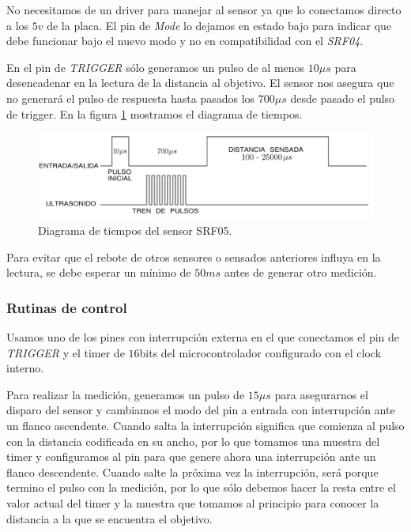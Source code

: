 No necesitamos de un driver para manejar al sensor ya que lo conectamos directo a los $5v$ de la placa.
El pin de \emph{Mode} lo dejamos en estado bajo para indicar que debe funcionar bajo el nuevo modo y no en compatibilidad con el \emph{SRF04}.

En el pin de \emph{TRIGGER} s\'olo generamos un pulso de al menos $10\mu s$ para desencadenar en la lectura de la distancia al objetivo.
El sensor nos asegura que no generar\'a el pulso de respuesta hasta pasados los $700\mu s$ desde pasado el pulso de trigger.
En la figura \ref{hF_srf05_pulse} mostramos el diagrama de tiempos.

\begin{figure}[ht]
	\centering
	\includegraphics[scale=0.25]{figuras/srf05_pulse.png}
	\caption{Diagrama de tiempos del sensor SRF05.}
	\label{hF_srf05_pulse}
\end{figure}

Para evitar que el rebote de otros sensores o sensados anteriores influya en la lectura, se debe esperar un m\'inimo de $50ms$ antes de
generar otro medici\'on.

\subsubsection{Rutinas de control}
\label{h_sensado_ultrasonido_rutinas}

Usamos uno de los pines con interrupci\'on externa en el que conectamos el pin de \emph{TRIGGER} y el timer de $16$bits del microcontrolador
configurado con el clock interno.

Para realizar la medici\'on, generamos un pulso de $15\mu s$ para asegurarnos el disparo del sensor y cambiamos el modo del pin a entrada con
interrupci\'on ante un flanco ascendente.
Cuando salta la interrupci\'on significa que comienza al pulso con la distancia codificada en su ancho, por lo que tomamos una muestra del
timer y configuramos al pin para que genere ahora una interrupci\'on ante un flanco descendente.
Cuando salte la pr\'oxima vez la interrupci\'on, ser\'a porque termino el pulso con la medici\'on, por lo que s\'olo debemos hacer la resta
entre el valor actual del timer y la muestra que tomamos al principio para conocer la distancia a la que se encuentra el objetivo.

